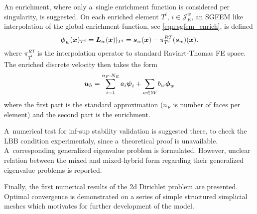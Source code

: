 An enrichment, where only a~single enrichment function is considered per singularity, is suggested.
On each enriched element $T^i,\, i\in\mathcal{J}^w_E$, an SGFEM like interpolation 
of the global enrichment function, see \eqref{eqn:sgfem_enrich}, is defined
\begin{equation}
    \mathbf{\boldsymbol{\phi}}_w(\mathbf{\boldsymbol{x}})_{T^i} = \mathbf{\boldsymbol{L}}_{w}(\mathbf{\boldsymbol{x}})|_{T^i} = \mathbf{\boldsymbol{s}}_w(\mathbf{\boldsymbol{x}}) - \pi^{RT}_{T^i}(\mathbf{\boldsymbol{s}}_w)(\mathbf{\boldsymbol{x}}).
    \label{eqn:local_enr_vel}
\end{equation}
where $\pi^{RT}_{T^i}$ is the interpolation operator to standard Raviart-Thomas FE space.
The enriched discrete velocity then takes the form
\begin{equation}
    \mathbf{\boldsymbol{u}}_h = 
    \sum \limits_{i=1}^{n_F\cdot N_E} a_i \mathbf{\boldsymbol{\psi}}_i + 
    \sum \limits_{w\in\mathcal{W}} b_w \mathbf{\boldsymbol{\phi}}_w
    \label{eqn:velocity_enriched_approximation}
\end{equation}
where the first part is the standard approximation ($n_F$ is number of faces per element)
and the second part is the enrichment.

A~numerical test for inf-sup stability validation is suggested there,
to check the LBB condition experimentaly, since a~theoretical proof is unavailable.
A~corresponding generalized eigenvalue problem is formulated.
However, unclear relation between the mixed and mixed-hybrid form regarding
their generalized eigenvalue problems is reported.

Finally, the first numerical results of the 2d Dirichlet problem are presented.
Optimal convergence is demonstrated on a series of simple structured simplicial meshes
which motivates for further development of the model.

